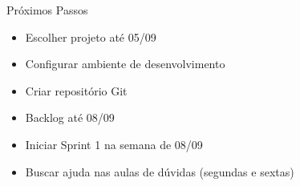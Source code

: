 \documentclass[10pt]{beamer}
\begin{document}
\begin{frame}{Próximos Passos}
\begin{itemize}
    \item Escolher projeto até 05/09
    \item Configurar ambiente de desenvolvimento
    \item Criar repositório Git
    \item Backlog até 08/09
    \item Iniciar Sprint 1 na semana de 08/09
    \item Buscar ajuda nas aulas de dúvidas (segundas e sextas)
\end{itemize}
\end{frame}
\end{document}
